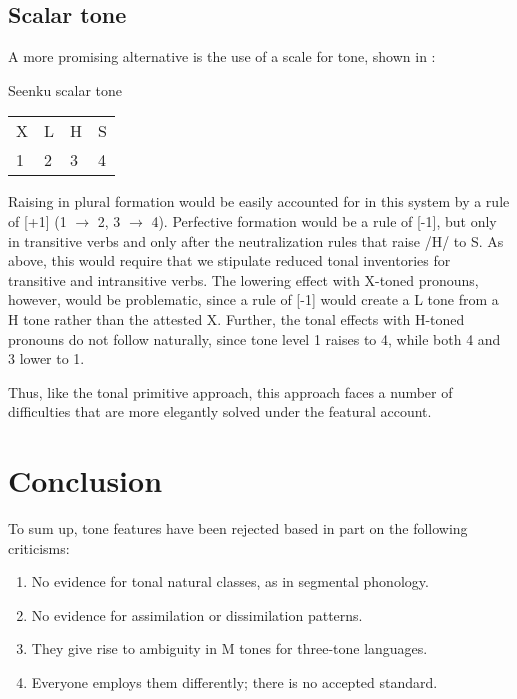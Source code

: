 \documentclass[output=paper]{langsci/langscibook}
\begin{document}
\subsection{Scalar tone}\label{sec:mcpherson:5.2}

A more promising alternative is the use of a scale for tone, shown in :

\ea\label{ex:mcpherson:26} Seenku scalar tone \\
\begin{tabular}[t]{llll}
  X &  L & H & S \\
  1 & 2 & 3 & 4 \\
\end{tabular}
\z

Raising in plural formation would be easily accounted for in this system by a rule of [+1] (1 $\rightarrow$ 2, 3 $\rightarrow$ 4). Perfective formation would be a rule of [-1], but only in transitive verbs and only after the neutralization rules that raise /H/ to S. As above, this would require that we stipulate reduced tonal inventories for transitive and intransitive verbs. The lowering effect with X-toned pronouns, however, would be problematic, since a rule of [-1] would create a L tone from a H tone rather than the attested X. Further, the tonal effects with H-toned pronouns do not follow naturally, since tone level 1 raises to 4, while both 4 and 3 lower to 1.

Thus, like the tonal primitive approach, this approach faces a number of difficulties that are more elegantly solved under the featural account.


\section{Conclusion}\label{sec:mcpherson:SecConclusion}

To sum up, tone features have been rejected based in part on the following criticisms:

\begin{enumerate}[noitemsep]
  \item No evidence for tonal natural classes, as in segmental phonology. 
  \item No evidence for assimilation or dissimilation patterns.
  \item They give rise to ambiguity in M tones for three-tone languages.
  \item Everyone employs them differently; there is no accepted standard.
\end{enumerate}
\end{document}
